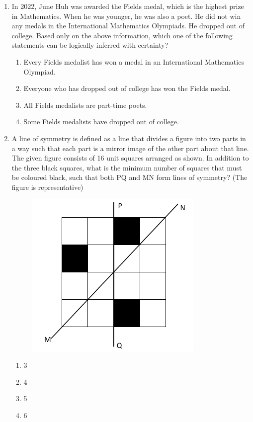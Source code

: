 \documentclass{article}
\begin{document}
\begin{enumerate}[leftmargin=*]
\item In 2022, June Huh was awarded the Fields medal, which is the highest prize in Mathematics. When he was younger, he was also a poet. He did not win any medals in the International Mathematics Olympiads. He dropped out of college. Based only on the above information, which one of the following statements can be logically inferred with certainty?
\begin{multicols}{2}
\begin{enumerate}
\item Every Fields medalist has won a medal in an International Mathematics Olympiad.
\item Everyone who has dropped out of college has won the Fields medal.
\item All Fields medalists are part-time poets.
\item Some Fields medalists have dropped out of college.
\end{enumerate}
\end{multicols}

\item A line of symmetry is defined as a line that divides a figure into two parts in a way such that each part is a mirror image of the other part about that line. The given figure consists of 16 unit squares arranged as shown. In addition to the three black squares, what is the minimum number of squares that must be coloured black, such that both PQ and MN form lines of symmetry? (The figure is representative)
\begin{figure}[H]
    \centering
    \includegraphics[width=0.3\linewidth]{figs/q5.png}
    \caption{}
    \label{fig:q5}
\end{figure}
\begin{multicols}{4}
\begin{enumerate}
\item 3
\item 4
\item 5
\item 6
\end{enumerate}
\end{multicols}


\end{enumerate}
\end{document}
